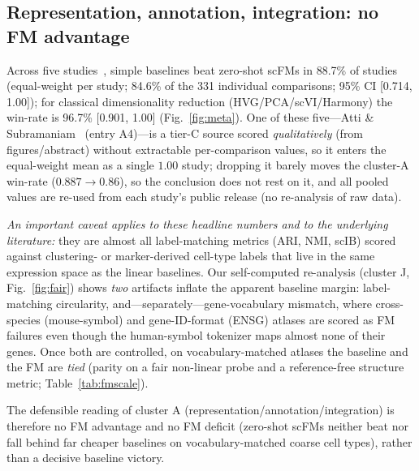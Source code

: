 \documentclass[fleqn,10pt,lineno]{wlpeerj}  %
\begin{document}
\subsection{Representation, annotation, integration: no FM advantage}
Across five studies~\cite{kedzierska2025,boiarsky2024,wu2025,atti2025,bendidi2024}, simple baselines beat zero-shot scFMs in 88.7\% of studies (equal-weight per study; 84.6\% of the 331 individual comparisons; 95\% CI [0.714, 1.00]); for classical dimensionality reduction (HVG/PCA/scVI/Harmony) the win-rate is 96.7\% [0.901, 1.00] (Fig.~\ref{fig:meta}). One of these five---Atti \& Subramaniam~\cite{atti2025} (entry A4)---is a tier-C source scored \emph{qualitatively} (from figures/abstract) without extractable per-comparison values, so it enters the equal-weight mean as a single $1.00$ study; dropping it barely moves the cluster-A win-rate ($0.887\!\to\!0.86$), so the conclusion does not rest on it, and all pooled values are re-used from each study's public release (no re-analysis of raw data).

\emph{An important caveat applies to these headline numbers and to the underlying literature:} they are almost all label-matching metrics (ARI, NMI, scIB) scored against clustering- or marker-derived cell-type labels that live in the same expression space as the linear baselines. Our self-computed re-analysis (cluster J, Fig.~\ref{fig:fair}) shows \emph{two} artifacts inflate the apparent baseline margin: label-matching circularity, and---separately---gene-vocabulary mismatch, where cross-species (mouse-symbol) and gene-ID-format (ENSG) atlases are scored as FM failures even though the human-symbol tokenizer maps almost none of their genes. Once both are controlled, on vocabulary-matched atlases the baseline and the FM are \emph{tied} (parity on a fair non-linear probe and a reference-free structure metric; Table~\ref{tab:fmscale}).

The defensible reading of cluster A (representation/annotation/integration) is therefore no FM advantage and no FM deficit (zero-shot scFMs neither beat nor fall behind far cheaper baselines on vocabulary-matched coarse cell types), rather than a decisive baseline victory.
\end{document}
